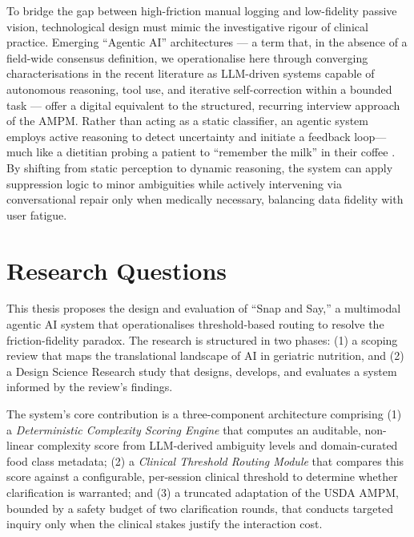 To bridge the gap between high-friction manual logging and low-fidelity passive vision, technological design must mimic the investigative rigour of clinical practice. Emerging ``Agentic AI'' architectures --- a term that, in the absence of a field-wide consensus definition, we operationalise here through converging characterisations in the recent literature \citep{xiRisePotentialLarge2025,qiuLLMbasedAgenticSystems2024,sumersCognitiveArchitecturesLanguage2023} as LLM-driven systems capable of autonomous reasoning, tool use, and iterative self-correction within a bounded task --- offer a digital equivalent to the structured, recurring interview approach of the AMPM. Rather than acting as a static classifier, an agentic system employs active reasoning to detect uncertainty and initiate a feedback loop---much like a dietitian probing a patient to ``remember the milk'' in their coffee \citep{tuConversationalDiagnosticArtificial2025,kuhnCLAMSelectiveClarification2023}. By shifting from static perception to dynamic reasoning, the system can apply suppression logic to minor ambiguities while actively intervening via conversational repair only when medically necessary, balancing data fidelity with user fatigue.

\section{Research Questions}

This thesis proposes the design and evaluation of ``Snap and Say,'' a multimodal agentic AI system that operationalises threshold-based routing to resolve the friction-fidelity paradox. The research is structured in two phases: (1) a scoping review that maps the translational landscape of AI in geriatric nutrition, and (2) a Design Science Research study that designs, develops, and evaluates a system informed by the review's findings.

The system's core contribution is a three-component architecture comprising (1) a \emph{Deterministic Complexity Scoring Engine} that computes an auditable, non-linear complexity score from LLM-derived ambiguity levels and domain-curated food class metadata; (2) a \emph{Clinical Threshold Routing Module} that compares this score against a configurable, per-session clinical threshold to determine whether clarification is warranted; and (3) a truncated adaptation of the USDA AMPM, bounded by a safety budget of two clarification rounds, that conducts targeted inquiry only when the clinical stakes justify the interaction cost.

